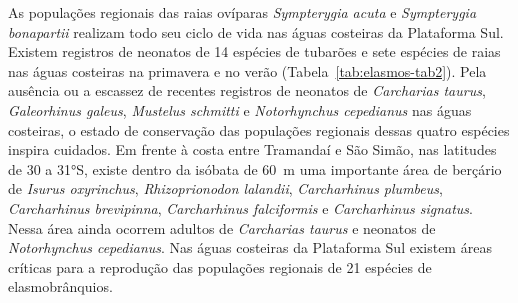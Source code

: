 \documentclass[a4paper,11pt,twoside,showtrims,onecolumn,openright,final]{memoir}
\begin{document}
As populações regionais das raias ovíparas \emph{Sympterygia acuta} e \emph{Sympterygia bonapartii} 
realizam todo seu ciclo de vida nas águas costeiras da Plataforma Sul. Existem registros de neonatos 
de 14 espécies de tubarões e sete espécies de raias nas águas costeiras na primavera e no verão (Tabela~\ref{tab:elasmos-tab2}). 
Pela ausência ou a escassez de recentes registros de neonatos de \emph{Carcharias taurus}, 
\emph{Galeorhinus galeus}, \emph{Mustelus schmitti} e \emph{Notorhynchus cepedianus} nas águas costeiras, 
o estado de conservação das populações regionais dessas quatro espécies inspira cuidados. 
Em frente à costa entre Tramandaí e São Simão, nas latitudes de 30 a 31°S, existe dentro da isóbata de 60~m 
uma importante área de berçário de \emph{Isurus oxyrinchus}, \emph{Rhizoprionodon lalandii}, 
\emph{Carcharhinus plumbeus}, \emph{Carcharhinus brevipinna}, \emph{Carcharhinus falciformis} e 
\emph{Carcharhinus signatus}. Nessa área ainda ocorrem adultos de \emph{Carcharias taurus} e neonatos 
de \emph{Notorhynchus cepedianus}. Nas águas costeiras da Plataforma Sul existem áreas críticas para a 
reprodução das populações regionais de 21 espécies de elasmobrânquios.

%
\end{document}
